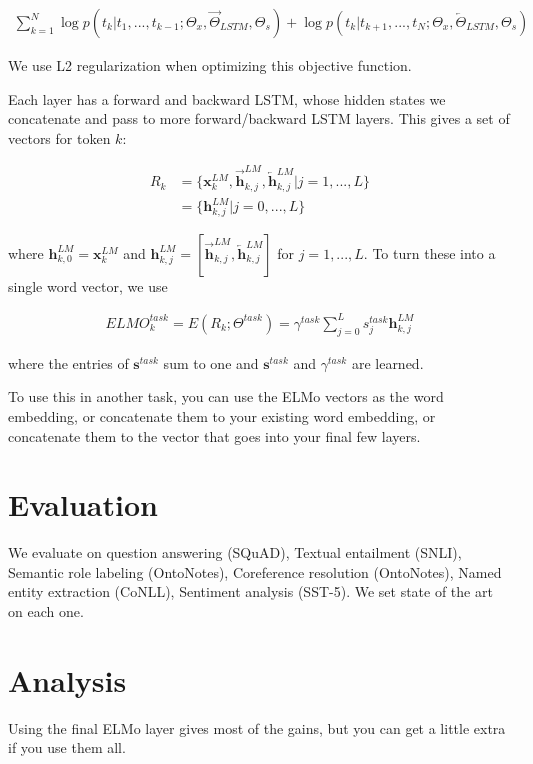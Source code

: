 \documentclass[a4paper]{article}
\begin{document}
\begin{align}
  \sum_{k=1}^{N}{
    \log{p(t_k | t_1, ..., t_{k-1}; \Theta_x, \overrightarrow{\Theta}_{LSTM}, \Theta_s)}
    + \log{p(t_k | t_{k+1}, ..., t_{N}; \Theta_x, \overleftarrow{\Theta}_{LSTM}, \Theta_s)}
  }
\end{align}

We use L2 regularization when optimizing this objective function.

Each layer has a forward and backward LSTM, whose hidden states we
concatenate and pass to more forward/backward LSTM layers. This gives a
set of vectors for token $k$:

\begin{align}
  R_k &= \{\bm{x}_k^{LM}, \overrightarrow{\bm{h}}_{k,j}^{LM}, \overleftarrow{\bm{h}}_{k,j}^{LM} | j = 1,...,L\} \\
    &= \{\bm{h}_{k, j}^{LM} | j = 0, ..., L \}
\end{align}

where $\bm{h}_{k, 0}^{LM} = \mathbf{x}_k^{LM}$ and
$\mathbf{h}_{k, j}^{LM} = [\overrightarrow{\mathbf{h}}_{k,j}^{LM}, \overleftarrow{\mathbf{h}}_{k,j}^{LM}]$
for $j = 1, ..., L$. To turn these into a single word vector, we use

\begin{align}
  ELMO_{k}^{task} = E(R_k; \Theta^{task}) = \gamma^{task} \sum_{j=0}^{L}{
    s_j^{task} \mathbf{h}_{k, j}^{LM}
  }
\end{align}

where the entries of $\mathbf{s}^{task}$ sum to one and $\mathbf{s}^{task}$
and $\gamma^{task}$ are learned.

To use this in another task, you can use the ELMo vectors as the word embedding,
or concatenate them to your existing word embedding, or concatenate them
to the vector that goes into your final few layers.

\section{Evaluation}
We evaluate on question answering (SQuAD), Textual entailment (SNLI),
Semantic role labeling (OntoNotes), Coreference resolution (OntoNotes),
Named entity extraction (CoNLL), Sentiment analysis (SST-5). We set state
of the art on each one.

\section{Analysis}
Using the final ELMo layer gives most of the gains, but you can get a little
extra if you use them all.
\end{document}
